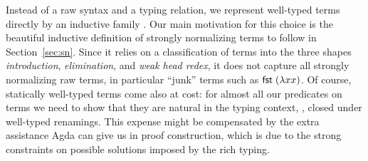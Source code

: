 Instead of a raw syntax and a typing relation, we represent well-typed
terms directly by an inductive family
\citep{dybjer:inductiveFamilies}.
Our main motivation for this
choice is the beautiful inductive definition of strongly normalizing terms to
follow in Section~\ref{sec:sn}.  Since it relies on a classification
of terms into the three shapes \emph{introduction},
\emph{elimination}, and \emph{weak head redex}, it does not capture all strongly normalizing raw terms, in particular
``junk'' terms such as $\mathsf{fst}\;(\lambda x x)$.  Of
course, statically well-typed terms come also at cost: for almost all
our predicates on terms we need to show that they are natural in the
typing context, \ie, closed under well-typed renamings.  This expense
might be compensated by the extra assistance Agda can give us in
proof construction, which is due to the strong constraints on possible
solutions imposed by the rich typing.





